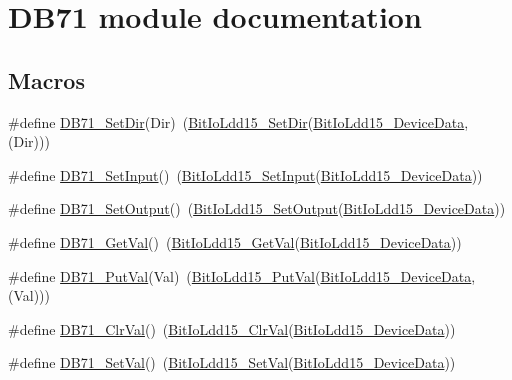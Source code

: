\hypertarget{group___d_b71__module}{}\section{D\+B71 module documentation}
\label{group___d_b71__module}
\subsection*{Macros}
\begin{DoxyCompactItemize}
\item 
\#define \hyperlink{group___d_b71__module_gafedf042e1fa1b23fd4c49e6a995b2c58}{D\+B71\+\_\+\+Set\+Dir}(Dir)~(\hyperlink{group___bit_io_ldd15__module_gaa625d107e194a1e065b8a51f20545860}{Bit\+Io\+Ldd15\+\_\+\+Set\+Dir}(\hyperlink{group___bit_io_ldd15__module_ga7e053a3640af5a7522d2864dea4be75f}{Bit\+Io\+Ldd15\+\_\+\+Device\+Data}, (Dir)))
\item 
\#define \hyperlink{group___d_b71__module_gafbcbfd1c236ddf7cf5a7d9d9e5a440e5}{D\+B71\+\_\+\+Set\+Input}()~(\hyperlink{group___bit_io_ldd15__module_gada439e248c981dbaf15efd269de4d4d2}{Bit\+Io\+Ldd15\+\_\+\+Set\+Input}(\hyperlink{group___bit_io_ldd15__module_ga7e053a3640af5a7522d2864dea4be75f}{Bit\+Io\+Ldd15\+\_\+\+Device\+Data}))
\item 
\#define \hyperlink{group___d_b71__module_gaceafb220a6540f1805ab770146092bfb}{D\+B71\+\_\+\+Set\+Output}()~(\hyperlink{group___bit_io_ldd15__module_ga507454e3c3f8d84768c97902fad489a1}{Bit\+Io\+Ldd15\+\_\+\+Set\+Output}(\hyperlink{group___bit_io_ldd15__module_ga7e053a3640af5a7522d2864dea4be75f}{Bit\+Io\+Ldd15\+\_\+\+Device\+Data}))
\item 
\#define \hyperlink{group___d_b71__module_ga43f1542b687b9ae7afdacb1949d983a0}{D\+B71\+\_\+\+Get\+Val}()~(\hyperlink{group___bit_io_ldd15__module_ga6b6e379b6e145395c401f29e07e51e6f}{Bit\+Io\+Ldd15\+\_\+\+Get\+Val}(\hyperlink{group___bit_io_ldd15__module_ga7e053a3640af5a7522d2864dea4be75f}{Bit\+Io\+Ldd15\+\_\+\+Device\+Data}))
\item 
\#define \hyperlink{group___d_b71__module_gaf2673b64087da2761a5f6f62be9e3ef2}{D\+B71\+\_\+\+Put\+Val}(Val)~(\hyperlink{group___bit_io_ldd15__module_ga875a36906d376856264c546b784ae909}{Bit\+Io\+Ldd15\+\_\+\+Put\+Val}(\hyperlink{group___bit_io_ldd15__module_ga7e053a3640af5a7522d2864dea4be75f}{Bit\+Io\+Ldd15\+\_\+\+Device\+Data}, (Val)))
\item 
\#define \hyperlink{group___d_b71__module_ga928ab5130474516fff6fc8215f7b3240}{D\+B71\+\_\+\+Clr\+Val}()~(\hyperlink{group___bit_io_ldd15__module_ga4d39e4bded6e2f7edd0f350a6d72d2f6}{Bit\+Io\+Ldd15\+\_\+\+Clr\+Val}(\hyperlink{group___bit_io_ldd15__module_ga7e053a3640af5a7522d2864dea4be75f}{Bit\+Io\+Ldd15\+\_\+\+Device\+Data}))
\item 
\#define \hyperlink{group___d_b71__module_gacd074e92d172aad2f6212692966bc0ce}{D\+B71\+\_\+\+Set\+Val}()~(\hyperlink{group___bit_io_ldd15__module_ga49339ddbfe8f0278ee4f854d61235f4d}{Bit\+Io\+Ldd15\+\_\+\+Set\+Val}(\hyperlink{group___bit_io_ldd15__module_ga7e053a3640af5a7522d2864dea4be75f}{Bit\+Io\+Ldd15\+\_\+\+Device\+Data}))
\end{DoxyCompactItemize}


